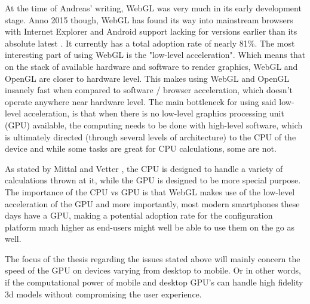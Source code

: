 At the time of Andreas' writing, WebGL was very much in its early development stage. Anno 2015 though, WebGL has found its way into mainstream browsers with Internet Explorer and Android support lacking for versions earlier than its absolute latest \cite{Can I Use}. It currently has a total adoption rate of nearly 81\%. The most interesting part of using WebGL is the "low-level acceleration". Which means that on the stack of available hardware and software to render graphics, WebGL and OpenGL are closer to hardware level. This makes using WebGL and OpenGL insanely fast when compared to software / browser acceleration, which doesn't operate anywhere near hardware level.
The main bottleneck for using said low-level acceleration, is that when there is no low-level graphics processing unit (GPU) available, the computing needs to be done with high-level software, which is ultimately directed (through several levels of architecture) to the CPU of the device and while some tasks are great for CPU calculations, some are not.
\newline 

\cite{Heterogeneous Computing Techniques}
\newline

As stated by Mittal and Vetter \cite{Heterogeneous Computing Techniques}, the CPU is designed to handle a variety of calculations thrown at it, while the GPU is designed to be more special purpose.
The importance of the CPU vs GPU is that WebGL makes use of the low-level acceleration of the GPU and more importantly, most modern smartphones these days have a GPU, making a potential adoption rate for the configuration platform much higher as end-users might well be able to use them on the go as well.


The focus of the thesis regarding the issues stated above will mainly concern the speed of the GPU on devices varying from desktop to mobile. Or in other words, if the computational power of mobile and desktop GPU's can handle high fidelity 3d models without compromising the user experience.

